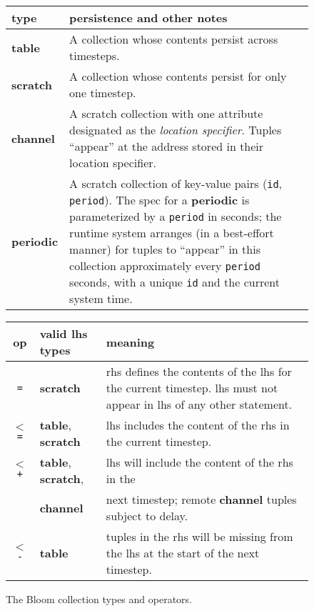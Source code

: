\begin{figure}
	\begin{small}
	\begin{tabular}{|l|p{2.55in}|}
		\hline
		type & persistence and other notes\\
		\hline
		\textbf{table} & A collection whose contents persist across timesteps.\\
		\textbf{scratch} & A collection whose contents persist for only one timestep.\\
		\textbf{channel} & A scratch collection with one attribute designated as the {\em location specifier}. Tuples ``appear'' at the address stored in their location specifier.\\
		\textbf{periodic} & A scratch collection of key-value pairs (\texttt{id}, \texttt{period}).  The spec for a \textbf{periodic} is parameterized by a \texttt{period} in seconds; the runtime system arranges (in a best-effort manner) for tuples to ``appear'' in this collection approximately every \texttt{period} seconds, with a unique \texttt{id} and the current system time.\\
		\hline
	\end{tabular}

	\vspace{2em}
	
	\begin{tabular}{|c|l|p{2in}|}
		\hline
		op & valid lhs types & meaning\\
				\hline 
		\texttt{=} & \textbf{scratch} & rhs defines the contents of the lhs for the current timestep.  lhs must not appear in lhs of any other statement.\\
		\texttt{$<$=} & \textbf{table}, \textbf{scratch} & lhs includes the content of the rhs in the current timestep.\\
		\texttt{$<$+} & \textbf{table}, \textbf{scratch}, & lhs will include the content of the rhs in the\\
		              & \textbf{channel} &  next timestep; remote \textbf{channel} tuples subject to delay.\\
		\texttt{$<$-} & \textbf{table} & tuples in the rhs will be missing from the lhs at the start of  the next timestep.\\
		\hline
	\end{tabular}
	\end{small}
	\caption{The Bloom collection types and operators.}
	\label{tab:bloom}
\end{figure}

